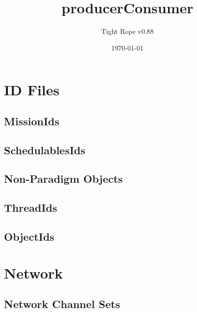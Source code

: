 \documentclass[10pt,a4paper]{article}
\title{producerConsumer}
\author{Tight Rope v0.88}
\date{\today}
\begin{document}
\maketitle

\section{ID Files}
\subsection{MissionIds}

\newpage

\subsection{SchedulablesIds}

\newpage

\subsection{Non-Paradigm Objects}

\newpage
{}

\newpage

\subsection{ThreadIds}

\newpage

\subsection{ObjectIds}

\newpage

\section{Network}
\subsection{Network Channel Sets}




{}
\end{document}
